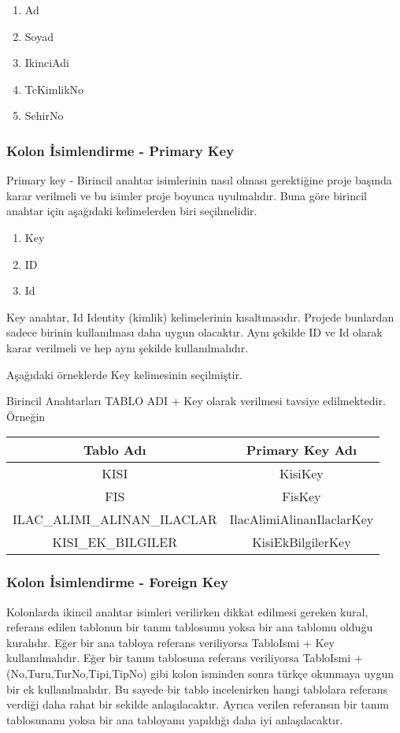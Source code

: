 \documentclass[10pt,a4paper,draft]{article}
\begin{document}
\begin{enumerate}
\item Ad
\item Soyad
\item IkinciAdi
\item TcKimlikNo
\item SehirNo
\end{enumerate}

\subsubsection{Kolon İsimlendirme - Primary Key}
Primary key - Birincil anahtar isimlerinin nasıl olması gerektiğine proje başında karar verilmeli ve bu isimler
proje boyunca uyulmalıdır.
Buna göre birincil anahtar için aşağıdaki kelimelerden biri seçilmelidir.
\begin{enumerate}
\item Key
\item ID
\item Id
\end{enumerate}
Key anahtar, Id Identity (kimlik) kelimelerinin kısaltmasıdır.
Projede bunlardan sadece birinin kullanılması daha uygun olacaktır.
Aynı şekilde ID ve Id olarak karar verilmeli ve hep aynı şekilde kullanılmalıdır.

Aşağıdaki örneklerde Key kelimesinin seçilmiştir.

Birincil Anahtarları TABLO ADI + Key olarak verilmesi tavsiye edilmektedir.
Örneğin

\begin{tabular}{|c|c|}
\hline Tablo Adı & Primary Key Adı \\ 
\hline KISI & KisiKey \\ 
\hline FIS & FisKey \\ 
\hline ILAC\_ALIMI\_ALINAN\_ILACLAR & IlacAlimiAlinanIlaclarKey \\ 
\hline  KISI\_EK\_BILGILER & KisiEkBilgilerKey \\ 
\hline 
\end{tabular} 



\subsubsection{Kolon İsimlendirme - Foreign Key}

Kolonlarda ikincil anahtar isimleri verilirken dikkat edilmesi gereken kural,
referans edilen tablonun bir tanım tablosumu yoksa bir ana tablomu olduğu kuralıdır.
Eğer bir ana tabloya referans veriliyorsa TabloIsmi + Key kullanılmalıdır.
Eğer bir tanım tablosuna referans veriliyorsa TabloIsmi + (No,Turu,TurNo,Tipi,TipNo)
gibi kolon isminden sonra türkçe okunmaya uygun bir ek kullanılmalıdır.
Bu sayede bir tablo incelenirken hangi tablolara referans verdiği daha rahat bir
sekilde anlaşılacaktır. 
Ayrıca verilen referansın bir tanım tablosunamı yoksa bir ana tabloyamı yapıldığı
daha iyi anlaşılacaktır.
\end{document}
